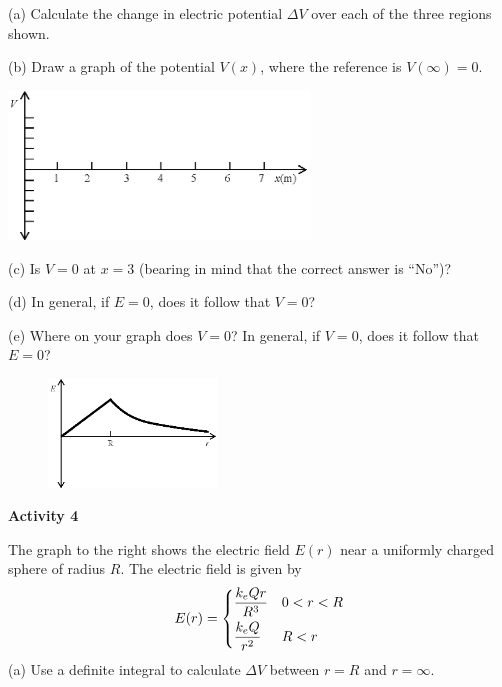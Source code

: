 (a) Calculate the change in electric potential $\Delta V$ over each of the three regions shown.
\vspace{1.2in}

(b) Draw a graph of the potential $V(x)$, where the reference is $V(\infty)=0$.
\begin{center}
\includegraphics[width=0.6\textwidth]{finding_v_from_e/fig6.eps}
\end{center}

(c) Is $V=0$ at $x=3$ (bearing in mind that the correct answer is ``No'')?
\vspace{0.6in}

(d) In general, if $E=0$, does it follow that $V=0$?
\vspace{0.6in}

(e) Where on your graph does $V=0$?  In general, if $V=0$, does it follow that $E=0$?
\vspace{0.6in}

\pagebreak[2]
\begin{figure}
    \includegraphics[width=0.4\textwidth]{finding_v_from_e/fig7.eps}
\end{figure}

\textbf{Activity 4} 

The graph to the right shows the electric field $E(r)$ near a uniformly charged sphere of radius $R$.  The electric field is given by
\begin{displaymath}
E(r) = \begin{dcases}
        \frac{k_eQr}{R^3}  &  0<r<R\\
        \frac{k_eQ}{r^2}  &  R<r
        \end{dcases}
\end{displaymath}
(a) Use a definite integral to calculate $\Delta V$  between $r=R$ and $r=\infty$.
\vspace{1.1in}

